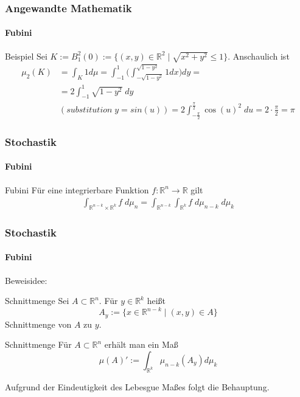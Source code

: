 \documentclass{beamer}
\begin{document}
 \begin{frame}
    \frametitle{Angewandte Mathematik}
    \framesubtitle{Fubini}
    \begin{block}{Beispiel}
Sei $K := B^2_1(0) := \{   (x,y) \in \mathbb{R}^2 \; | \; \sqrt{x^2 + y^2 } \leq 1\}$. Anschaulich ist
\begin{align*}
\mu_2(K) &  = \int_K 1 d \mu =  \int_{-1}^{1} \biggl ( \int_{-\sqrt{1- y^2}}^{\sqrt{1- y^2}} 1 dx \biggr ) dy = \\ 
& =  2 \int_{-1}^{1}  \sqrt{1 - y^2}   \; dy  \\ 
 & (substitution \;   y = sin(u)) =   2 \int_{-\frac{\pi}{2}}^{\frac{\pi}{2}}   \cos(u)^2   \; du = 2 \cdot \frac{\pi}{2} = \pi
\end{align*}
\end{block}
 \end{frame}
 
 \begin{frame}
    \frametitle{Stochastik}
\framesubtitle{Fubini}
    \begin{block}{Fubini}
        Für eine integrierbare Funktion $f: \mathbb{R}^n \to \mathbb{R}$ gilt
        \begin{align*}
        \int_{\mathbb{R}^{n-k} \times \mathbb{R}^{k}} f \; d\mu_n  =  \int_{\mathbb{R}^{n-k}}  \int_{\mathbb{R}^k}  f \; d\mu_{n-k} \;  d\mu_k  
        \end{align*}
    \end{block}

\end{frame}

\begin{frame}
    \frametitle{Stochastik}
\framesubtitle{Fubini}
Beweisidee:

\begin{block}{Schnittmenge}
Sei $ A \subset \mathbb{R}^n$. Für $ y \in \mathbb{R}^k$ heißt
$$ A_y :=  \biggl \{    x \in \mathbb{R}^{n-k}  \; | \;  (x,y) \in A \biggr \}$$  
Schnittmenge von $A$ zu $y$.
\end{block}

\begin{block}{Schnittmenge}
    Für $A \subset \mathbb{R}^n $ erhält man ein Maß
    $$ \mu(A)' := \int_{\mathbb{R}^k} \mu_{n-k}(A_y) d \mu_k$$ 
\end{block}
Aufgrund der Eindeutigkeit des Lebesgue Maßes folgt die Behauptung.
\end{frame}
\end{document}
